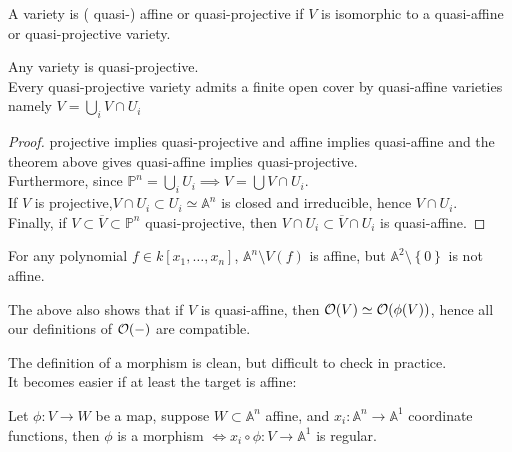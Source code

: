 \documentclass[../main.tex]{subfiles}
\begin{document}
\begin{defn}
	A variety is ( quasi-) affine or quasi-projective if $V$ is isomorphic to a quasi-affine or quasi-projective variety.
\end{defn}
\begin{crly}
Any variety is quasi-projective.\\
Every quasi-projective variety admits a finite open cover by  quasi-affine varieties namely $V = \bigcup_i V\cap U_i$ 
\end{crly}
\begin{proof}
projective implies quasi-projective and affine implies quasi-affine and the theorem above gives quasi-affine implies quasi-projective.\\
Furthermore, since $ \mathbb{P}^{n}= \bigcup_i U_i \implies V = \bigcup V\cap U_i$.\\
If $V$ is projective,$V\cap U_i \subset U_i \simeq \mathbb{A}^{n}$ is closed and irreducible, hence $V\cap U_i$.\\
Finally, if $V \subset \overline{V} \subset \mathbb{P}^{n}$ quasi-projective, then $V\cap U_i \subset \overline{V}\cap U_i$ is quasi-affine.
\end{proof}
\begin{exemple}
	For any polynomial $f\in k[x_1,\ldots,x_n]$, $ \mathbb{A}^{n}\setminus V( f) $ is affine, but $ \mathbb{A}^{2}\setminus \left\{ 0 \right\} $ is not affine.
\end{exemple}
\begin{rmq}
The above also shows that if $V$ is quasi-affine, then $\mathcal{O}( V) \simeq \mathcal{O}( \phi( V) ) $, hence all our definitions of $\mathcal{O}( -) $ are compatible.
\end{rmq}
The definition of a morphism is clean, but difficult to check in practice.\\
It becomes easier if at least the target is affine:
\begin{lemma}
Let $\phi:V\to W$ be a map, suppose $W \subset \mathbb{A}^{n}$ affine, and $ x_i:\mathbb{A}^{n}\to \mathbb{A}^{1}$ coordinate functions, then $\phi$ is a morphism $\iff x_i\circ\phi: V\to \mathbb{A}^{1}$ is regular.
\end{lemma}
\end{document}
